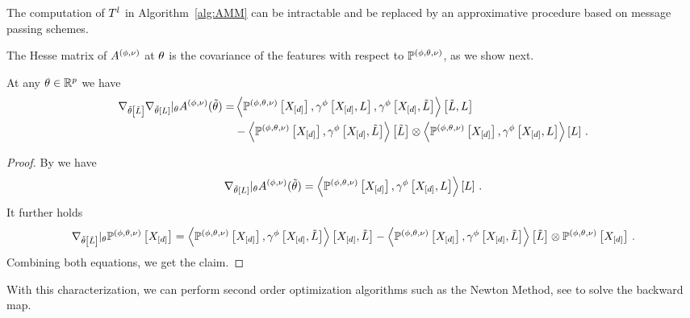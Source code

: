 %
The computation of $T^{l}$ in Algorithm~\ref{alg:AMM} can be intractable and be replaced by an approximative procedure based on message passing schemes.


The Hesse matrix of $A^{(\phi,\nu)}$ at $\theta$ is the covariance of the features with respect to $\mathbb{P}^{(\phi,\theta,\nu)}$, as we show next.

\begin{lemma}\label{lem:hesseCumfunction}
    At any $\theta\in\mathbb{R}^{p}$ we have
    \begin{align*}
       \nabla_{\tilde{\theta}\left[\tilde{L}\right]}\nabla_{\tilde{\theta}\left[L\right]}|_{\theta} A^{(\phi,\nu)}(\tilde{\theta})
       =& \left\langle \mathbb{P}^{(\phi,\theta,\nu)}\left[X_{[d]}\right],\gamma^{\phi}\left[X_{[d]},L\right],\gamma^{\phi}\left[X_{[d]},\tilde{L}\right]\right\rangle \left[ \tilde{L},L \right] \\
        &-  \left\langle \mathbb{P}^{(\phi,\theta,\nu)}\left[X_{[d]}\right],\gamma^{\phi}\left[X_{[d]},\tilde{L}\right]\right\rangle \left[ \tilde{L} \right] \otimes \left\langle \mathbb{P}^{(\phi,\theta,\nu)}\left[X_{[d]}\right],\gamma^{\phi}\left[X_{[d]},L\right]\right\rangle \left[ L \right] \, .
    \end{align*}
\end{lemma}
\begin{proof}
    By  we have
    \begin{align*}
        \nabla_{\tilde{\theta}\left[L\right]}|_{\theta} A^{(\phi,\nu)}(\tilde{\theta})
        = \left\langle \mathbb{P}^{(\phi,\theta,\nu)}\left[X_{[d]}\right],\gamma^{\phi}\left[X_{[d]},L\right]\right\rangle \left[ L \right] \, .
    \end{align*}
    It further holds
    \begin{align*}
        \nabla_{\tilde{\theta}\left[\tilde{L}\right]}|_{\theta} \mathbb{P}^{(\phi,\theta,\nu)}\left[X_{[d]}\right]
        = \left\langle \mathbb{P}^{(\phi,\theta,\nu)}\left[X_{[d]}\right],\gamma^{\phi}\left[X_{[d]},\tilde{L}\right]\right\rangle \left[ X_{[d]},\tilde{L} \right]
        - \left\langle \mathbb{P}^{(\phi,\theta,\nu)}\left[X_{[d]}\right],\gamma^{\phi}\left[X_{[d]},\tilde{L}\right]\right\rangle \left[ \tilde{L} \right] \otimes \mathbb{P}^{(\phi,\theta,\nu)}\left[X_{[d]}\right] \, .
    \end{align*}
    Combining both equations, we get the claim.
\end{proof}

With this characterization, we can perform second order optimization algorithms such as the Newton Method, see  to solve the backward map.

